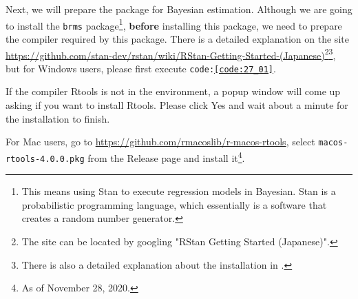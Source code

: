 \documentclass{ltjsarticle}
\begin{document}
Next, we will prepare the package for Bayesian estimation. Although we are going to install the \texttt{brms} package\footnote{This means using Stan to execute regression models in Bayesian. Stan is a probabilistic programming language, which essentially is a software that creates a random number generator.}, \textbf{before} installing this package, we need to prepare the compiler required by this package.
There is a detailed explanation on the site \url{https://github.com/stan-dev/rstan/wiki/RStan-Getting-Started-(Japanese)}\footnote{The site can be located by googling "RStan Getting Started (Japanese)".}\footnote{There is also a detailed explanation about the installation in \textcite{Baba201907}.}, but for Windows users, please first execute \texttt{code:\ref{code:27_01}}.


If the compiler Rtools is not in the environment, a popup window will come up asking if you want to install Rtools. Please click Yes and wait about a minute for the installation to finish.

For Mac users, go to \url{https://github.com/rmacoslib/r-macos-rtools}, select \texttt{macos-rtools-4.0.0.pkg} from the Release page and install it\footnote{As of November 28, 2020.}.
\end{document}

